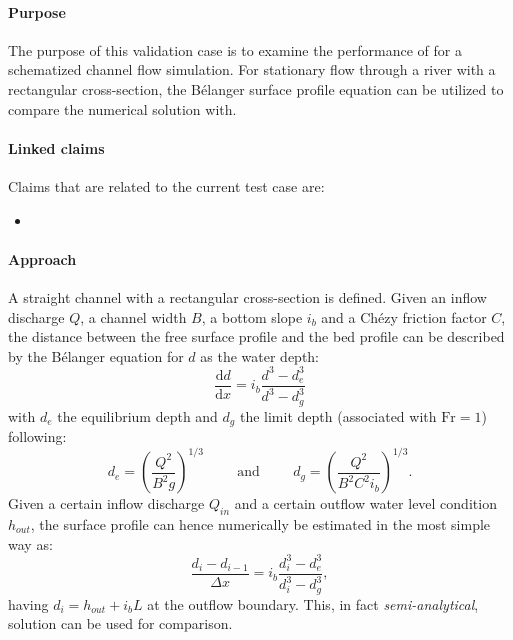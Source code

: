 

\paragraph*{Purpose}
The purpose of this validation case is to examine the performance of \DFLOWFM for a schematized channel flow simulation. For stationary flow through a river with a rectangular cross-section, the B\'elanger surface profile equation can be utilized to compare the numerical solution with.


\paragraph*{Linked claims}
Claims that are related to the current test case are:
\begin{itemize}
\item {}
\end{itemize}


\paragraph*{Approach}
A straight channel with a rectangular cross-section is defined. Given an inflow discharge $Q$, a channel width $B$, a bottom slope $i_b$ and a Ch\'ezy friction factor $C$, the distance between the free surface profile and the bed profile can be described by the B\'elanger equation for $d$ as the water depth:
\begin{equation}
\frac{\mathrm{d}d}{\mathrm{d}x} = i_b \frac{d^3 - d_e^3}{d^3 - d_g^3}
\end{equation}
with $d_e$ the equilibrium depth and $d_g$ the limit depth (associated with $\mathrm{Fr} = 1$) following:
\begin{equation}
d_e = \left(\frac{Q^2}{B^2 g}\right)^{1/3} \hspace{1cm} \textrm{and} \hspace{1cm} d_g = \left(\frac{Q^2}{B^2 C^2 i_b}  \right)^{1/3}.
\end{equation}
Given a certain inflow discharge $Q_{in}$ and a certain outflow water level condition $h_{out}$, the surface profile can hence numerically be estimated in the most simple way as:
\begin{equation}
\frac{d_{i} - d_{i-1}}{\Delta x} = i_b \frac{d^3_{i} - d_e^3}{d^3_{i} - d_g^3},
\end{equation}
having $d_i = h_{out} + i_b L$ at the outflow boundary. This, in fact \emph{semi-analytical}, solution can be used for comparison.


